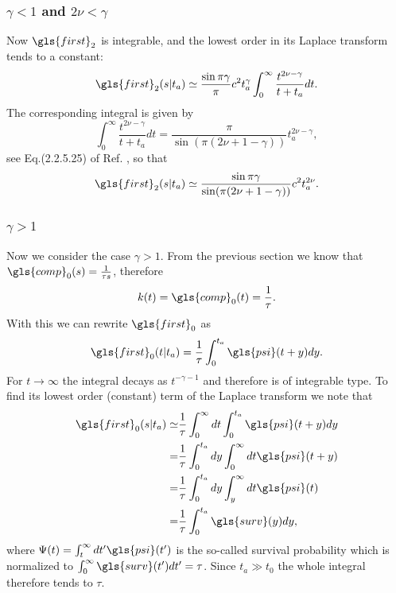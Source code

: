 \subsubsection{$\gamma <1$  and $2\nu < \gamma $} 
Now $\gls{first}_2$ is integrable, and the lowest order in its Laplace transform tends to a constant:
\begin{equation}
 \gls{first}_2(s|t_a) \simeq \frac{\sin \pi \gamma}{\pi}  c^2 t_a^\gamma \int_0^\infty \frac{ t^{2\nu-\gamma}}{t+t_a} dt.
\end{equation}
The corresponding integral is given by
\begin{equation}
 \int_0^\infty \frac{t^{2\nu-\gamma}}{t+t_a} dt = \frac{\pi }{\sin (\pi(2\nu +1- \gamma))}t_a^{2\nu - \gamma} ,
\end{equation}
see Eq.(2.2.5.25) of Ref. \cite{BryPr}, so that
\begin{equation}
 \gls{first}_2(s|t_a) \simeq   \frac{\sin \pi \gamma}{\sin (\pi(2\nu +1- \gamma))}c^2 t_a^{2\nu}.
\end{equation}

\subsubsection{$\gamma > 1$}
Now we consider the case $\gamma > 1$. From the previous section we know that $\gls{comp}_0(s)=\frac{1}{\tau s}$, therefore
\begin{equation}
k(t) =\gls{comp}_0(t)= \frac{1}{\tau} . \label{eqn:kGammaLarge}
\end{equation}
With this we can rewrite $\gls{first}_0$ as 
\begin{equation}
 \gls{first}_0(t|t_a) = \frac{1}{\tau} \int_0^{t_a} \gls{psi}(t+y)dy.
\end{equation}
For $t \to \infty$ the integral decays as $t^{-\gamma-1}$ and therefore is of integrable type. To find its lowest order (constant) term of the Laplace transform we note that
\begin{align}
 \gls{first}_0(s|t_a) \simeq & \frac{1}{\tau} \int_0^\infty dt \int_0^{t_a} \gls{psi}(t+y)dy \\
 =& \frac{1}{\tau} \int_0^{t_a} dy \int_0^\infty dt \gls{psi}(t+y)  \\
 =& \frac{1}{\tau} \int_0^{t_a} dy \int_y^\infty dt \gls{psi}(t) \\
 =& \frac{1}{\tau} \int^{t_a}_0 \gls{surv}(y) dy,
\end{align}
where $\Psi(t) = \int_t^\infty dt' \gls{psi}(t')$ is the so-called survival probability which is normalized to $\int_0^\infty \gls{surv}(t') dt' = \tau$. Since $t_a \gg t_0$ the whole integral therefore tends to $\tau$. 

